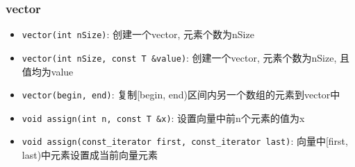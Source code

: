 \subsubsection{vector}
	\begin{itemize}
		\item \texttt{vector(int nSize)}: 创建一个vector, 元素个数为nSize
		\item \texttt{vector(int nSize, const T &value)}: 创建一个vector, 元素个数为nSize, 且值均为value
		\item \texttt{vector(begin, end)}: 复制[begin, end)区间内另一个数组的元素到vector中
		\item \texttt{void assign(int n, const T &x)}: 设置向量中前n个元素的值为x
		\item \texttt{void assign(const_iterator first, const_iterator last)}: 向量中[first, last)中元素设置成当前向量元素
	\end{itemize}

